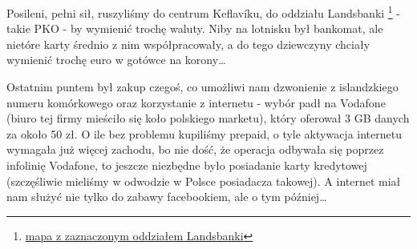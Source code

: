 

Posileni, pełni sił, ruszyliśmy do centrum Keflavíku, do oddziału Landsbanki \footnote{\href{https://www.google.com/url?q=https\%3A\%2F\%2Fmaps.google.com\%2Fmaps\%3Fq\%3D63.995522\%2C-22.548067}{mapa z zaznaczonym oddziałem Landsbanki}} - takie PKO - by wymienić trochę waluty. Niby na lotnisku był bankomat, ale nietóre karty średnio z nim współpracowały, a do tego dziewczyny chciały wymienić trochę euro w gotówce na korony…


Ostatnim puntem był zakup czegoś, co umożliwi nam dzwonienie z islandzkiego numeru komórkowego oraz korzystanie z internetu - wybór padł na Vodafone (biuro tej firmy mieściło się koło polskiego marketu), który oferował 3 GB danych za około 50 zł. O ile bez problemu kupiliśmy prepaid, o tyle aktywacja internetu wymagała już więcej zachodu, bo nie dość, że operacja odbywała się poprzez infolinię Vodafone, to jeszcze niezbędne było posiadanie karty kredytowej (szczęśliwie mieliśmy w odwodzie w Polsce posiadacza takowej). A internet miał nam służyć nie tylko do zabawy facebookiem, ale o tym później…


